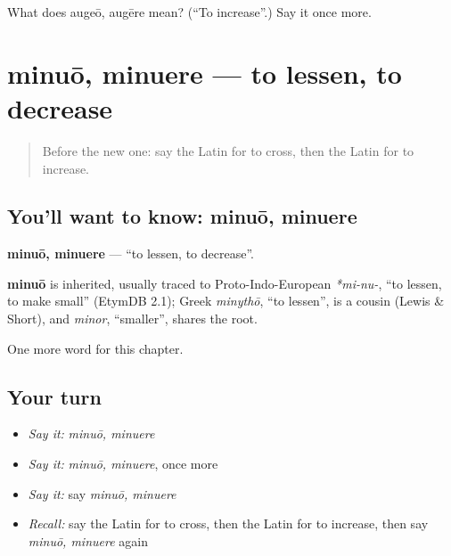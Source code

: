 \begin{tcolorbox}[breakable,colback=teal!4,colframe=teal!35!black,title={Before you move on}]
What does augeō, augēre mean? (\textquotedblleft{}To increase\textquotedblright{}.) Say it once more.
\end{tcolorbox}
\section[minuō, minuere]{minuō, minuere — to lessen, to decrease}

\label{lesson:LA-C256-minuo}



\begin{quote}
Before the new one: say the Latin for to cross, then the Latin for to increase.
\end{quote}

\subsection*{You'll want to know: minuō, minuere}
\textbf{minuō, minuere} — \textquotedblleft{}to lessen, to decrease\textquotedblright{}.

\begin{cousinweb}
\textbf{minuō} is inherited, usually traced to Proto-Indo-European \emph{*mi-nu-}, \textquotedblleft{}to lessen, to make small\textquotedblright{} (EtymDB 2.1); Greek \emph{minythō}, \textquotedblleft{}to lessen\textquotedblright{}, is a cousin (Lewis \& Short), and \emph{minor}, \textquotedblleft{}smaller\textquotedblright{}, shares the root.
\end{cousinweb}

\begin{grammarlens}[title={What you've built}]
One more word for this chapter.
\end{grammarlens}

\subsection*{Your turn}
\begin{itemize}
\raggedright
  \item \emph{Say it:} \emph{minuō, minuere}
  \item \emph{Say it:} \emph{minuō, minuere}, once more
  \item \emph{Say it:} say \emph{minuō, minuere}
  \item \emph{Recall:} say the Latin for to cross, then the Latin for to increase, then say \emph{minuō, minuere} again
\end{itemize}

